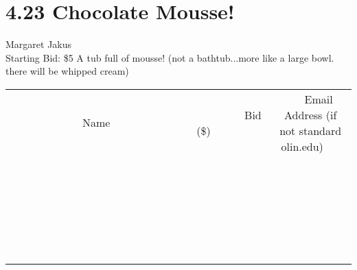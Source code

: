 \documentclass[11pt]{article}
\begin{document}
\section*{4.23 Chocolate Mousse!}
Margaret Jakus
\\
Starting Bid: \$5
\newline
A tub full of mousse! (not a bathtub...more like a large bowl. there will be whipped cream)
\\[6ex]
\begin{tabular}{c c c}
~~~~~~~~~~~~~Name~~~~~~~~~~~~~ & ~~~~~~~~~Bid (\$)~~~~~~~~~  & ~~~Email Address (if not standard olin.edu)~~~\\
 & & \\
\hline
 & & \\
\hline
 & & \\
\hline
 & & \\
\hline
 & & \\
\hline
 & & \\
\hline
 & & \\
\hline
 & & \\
\hline
 & & \\
\hline
 & & \\
\hline
 & & \\
\hline
 & & \\
\hline
 & & \\
\hline
 & & \\
\hline
 & & \\
\hline
 & & \\
\hline
 & & \\
\hline
 & & \\
\hline
 & & \\
\hline
 & & \\
\hline
 & & \\
\hline
 & & \\
\hline
 & & \\
\hline
 & & \\
\hline
 & & \\
\hline
 & & \\
\hline
\end{tabular}
\newpage
\end{document}
